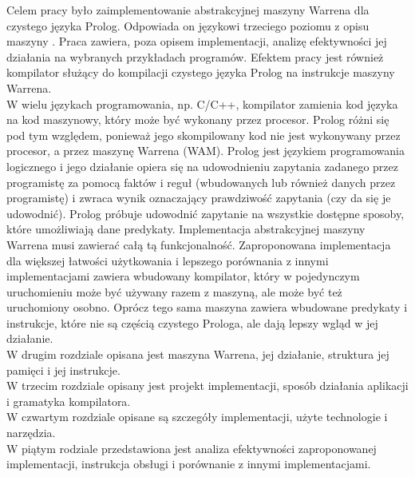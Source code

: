 Celem pracy było zaimplementowanie abstrakcyjnej maszyny Warrena dla czystego języka Prolog. Odpowiada on językowi trzeciego poziomu z opisu maszyny \cite{WAM}. Praca zawiera, poza opisem implementacji, analizę efektywności jej działania na wybranych przykładach programów.
Efektem pracy jest również kompilator służący do kompilacji czystego języka Prolog na instrukcje maszyny Warrena.\\
W wielu językach programowania, np. C/C++, kompilator zamienia kod języka na kod maszynowy, który może być wykonany przez procesor. Prolog różni się pod tym względem, ponieważ jego skompilowany kod nie jest wykonywany przez procesor, a przez maszynę Warrena (WAM). Prolog jest językiem programowania logicznego i jego działanie opiera się na udowodnieniu zapytania zadanego przez programistę za pomocą faktów i reguł (wbudowanych lub również danych przez programistę) i zwraca wynik oznaczający prawdziwość zapytania (czy da się je udowodnić). Prolog próbuje udowodnić zapytanie na wszystkie dostępne sposoby, które umożliwiają dane predykaty. Implementacja abstrakcyjnej maszyny Warrena musi zawierać całą tą funkcjonalność. Zaproponowana implementacja dla większej łatwości użytkowania i lepszego porównania z innymi implementacjami zawiera wbudowany kompilator, który w pojedynczym uruchomieniu może być używany razem z maszyną, ale może być też uruchomiony osobno. Oprócz tego sama maszyna zawiera wbudowane predykaty i instrukcje, które nie są częścią czystego Prologa, ale dają lepszy wgląd w jej działanie.\\

W drugim rozdziale opisana jest maszyna Warrena, jej działanie, struktura jej pamięci i jej instrukcje.\\
W trzecim rozdziale opisany jest projekt implementacji, sposób działania aplikacji i gramatyka kompilatora.\\
W czwartym rozdziale opisane są szczegóły implementacji, użyte technologie i narzędzia.\\
W piątym rodziale przedstawiona jest analiza efektywności zaproponowanej implementacji, instrukcja obsługi i porównanie z innymi implementacjami.